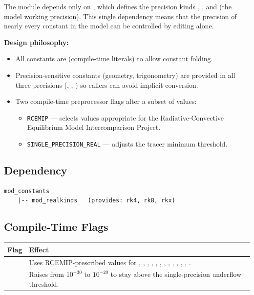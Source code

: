The module depends only on , which defines the
precision kinds , , and  (the model working
precision). This single dependency means that the precision of nearly every
constant in the model can be controlled by editing  alone.

\textbf{Design philosophy:}
\begin{itemize}
  \item All constants are  (compile-time literals) to allow
        constant folding.
  \item Precision-sensitive constants (geometry, trigonometry) are provided
        in all three precisions (, , ) so
        callers can avoid implicit conversion.
  \item Two compile-time preprocessor flags alter a subset of values:
    \begin{itemize}
      \item \texttt{RCEMIP} --- selects values appropriate for the
            Radiative-Convective Equilibrium Model Intercomparison Project.
      \item \texttt{SINGLE\_PRECISION\_REAL} --- adjusts the tracer minimum
            threshold.
    \end{itemize}
\end{itemize}

\subsection{Dependency}

\begin{lstlisting}
mod_constants
    |-- mod_realkinds   (provides: rk4, rk8, rkx)
\end{lstlisting}

\subsection{Compile-Time Flags}

\begin{longtable}{L{4cm} L{10cm}}
  \toprule
  \textbf{Flag} & \textbf{Effect} \\
  \midrule
  \endhead
  \bottomrule
  \endfoot
   &
    Uses RCEMIP-prescribed values for , ,
    , , , , ,
    , , , ,
    , . \\
   &
    Raises  from $10^{-30}$ to $10^{-20}$ to stay above the
    single-precision underflow threshold. \\
\end{longtable}

